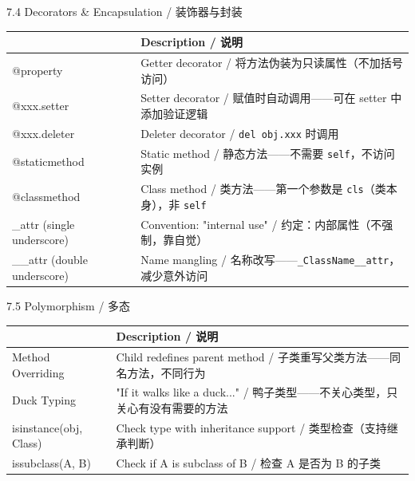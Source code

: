 \documentclass[11pt,a4paper]{report}
\let\oldtexttt\texttt
\renewcommand{\texttt}[1]{\textcolor{mainblue}{\oldtexttt{#1}}}
\begin{document}
\begin{cmdsection}{7.4  Decorators \& Encapsulation / 装饰器与封装}
\normalsize\renewcommand{\arraystretch}{1.4}
\centering
\begin{tabularx}{\textwidth}{@{}>{\ttfamily}l>{\raggedright\arraybackslash}X@{}}
\toprule
\multicolumn{1}{@{}l}{\textbf{Syntax}} & \textbf{Description / 说明} \\ \midrule
@property                   & Getter decorator / 将方法伪装为只读属性（不加括号访问） \\
@xxx.setter                 & Setter decorator / 赋值时自动调用——可在 setter 中添加验证逻辑 \\
@xxx.deleter                & Deleter decorator / \texttt{del obj.xxx} 时调用 \\
@staticmethod               & Static method / 静态方法——不需要 \texttt{self}，不访问实例 \\
@classmethod                & Class method / 类方法——第一个参数是 \texttt{cls}（类本身），非 \texttt{self} \\
\_attr (single underscore)  & Convention: "internal use" / 约定：内部属性（不强制，靠自觉） \\
\_\_attr (double underscore) & Name mangling / 名称改写——\texttt{\_ClassName\_\_attr}，减少意外访问 \\
\bottomrule
\end{tabularx}
\end{cmdsection}

\begin{cmdsection}{7.5  Polymorphism / 多态}
\normalsize\renewcommand{\arraystretch}{1.4}
\centering
\begin{tabularx}{\textwidth}{@{}>{\ttfamily}l>{\raggedright\arraybackslash}X@{}}
\toprule
\multicolumn{1}{@{}l}{\textbf{Concept}} & \textbf{Description / 说明} \\ \midrule
Method Overriding      & Child redefines parent method / 子类重写父类方法——同名方法，不同行为 \\
Duck Typing            & "If it walks like a duck..." / 鸭子类型——不关心类型，只关心有没有需要的方法 \\
isinstance(obj, Class) & Check type with inheritance support / 类型检查（支持继承判断） \\
issubclass(A, B)       & Check if A is subclass of B / 检查 A 是否为 B 的子类 \\
\bottomrule
\end{tabularx}
\end{cmdsection}
\end{document}
